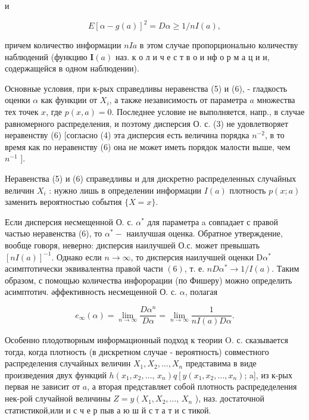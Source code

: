 \documentclass[10pt]{article}
\begin{document}
и

\[
E[\alpha-g(a)]^{2}=D \alpha \geqslant 1 / n I(a),
\]

причем количество информации $n I a$ в этом случае пропорционально количеству наблюдений (функцию $\boldsymbol{I}(a)$ наз. к о л и ч е с т в о и нф о р м а ц и и, содержащейся в одном наблюдении).

Основные условия, при к-рых справедливы неравенства (5) и (6), - гладкость оценки $\alpha$ как функции от $X_{i}$, а также независимость от параметра $a$ множества тех точек $x$, где $p(x, a)=0$. Последнее условие не выполняется, напр., в случае равномерного распределения, и поэтому дисперсия $О$. с. (3) не удовлетворяет неравенству (6) [согласно (4) эта дисперсия есть величина порядка $n^{-2}$, в то время как по неравенству (6) она не может иметь порядок малости выше, чем $n^{-1}$ ].

Неравенства (5) и (6) справедливы и для дискретно распределенных случайных величин $X_{i}$ : нужно лишь в определении информации $I(a)$ плотность $p(x ; a)$ заменить вероятностью события $\{X=x\}$.

Если дисперсия несмещенной О. с. $\alpha^{*}$ для параметра a совпадает с правой частью неравенства (6), то $\alpha^{*}-$ наилучшая оценка. Обратное утверждение, вообще говоря, неверно: дисперсия наилучшей О.с. может превышать $[n I(a)]^{-1}$. Однако если $n \rightarrow \infty$, то дисперсия наилучшей оценки $\mathrm{D} \alpha^{*}$ асимптотически эквивалентна правой части $(6)$, т. е. $n D \alpha^{*} \rightarrow 1 / I(a)$. Таким образом, с помощью количества инфорорации (по Фишеру) можно определить асимптотич. әффективность несмещенной О. с. $\alpha$, полагая

\[
e_{\infty}(\alpha)=\lim _{n \rightarrow \infty} \frac{D \alpha^{n}}{D \alpha}=\lim _{n \rightarrow \infty} \frac{1}{n I(a) D \alpha} .
\]

Особенно плодотворным информационный подход к теории O. с. сказывается тогда, когда плотность (в дискретном случае - вероятность) совместного распределения случайных величин $X_{1}, X_{2}, \ldots, X_{n}$ представима в виде произведения двух функций $h\left(x_{1}, x_{2}, \ldots\right.$, $\left.x_{n}\right) q\left[y\left(x_{1}, x_{2}, \ldots, x_{n}\right)\right.$; a], из к-рых первая не зависит от $a$, а вторая представляет собой плотность распредеделения нек-рой случайной величины $Z=y\left(X_{1}, X_{2}, \ldots\right.$, $X_{n}$ ), наз. достаточной статистикой,или и с ч е р пыв а ю ш й с т а т и с тикой.
\end{document}
